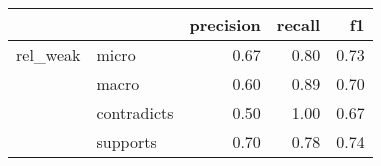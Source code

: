 \begin{tabular}{llrrr}
\toprule
         &          &  precision &  recall &   f1 \\
\midrule
rel\_weak & micro &       0.67 &    0.80 & 0.73 \\
         & macro &       0.60 &    0.89 & 0.70 \\
         & contradicts &       0.50 &    1.00 & 0.67 \\
         & supports &       0.70 &    0.78 & 0.74 \\
\bottomrule
\end{tabular}
